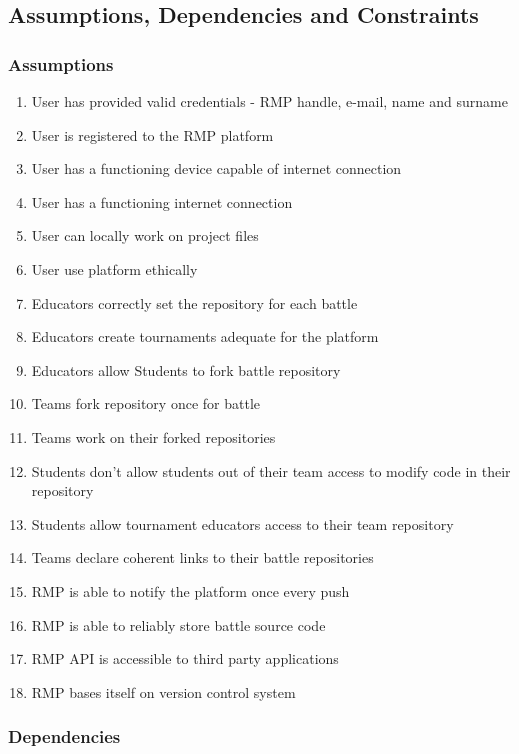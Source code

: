 \subsection{Assumptions, Dependencies and Constraints}

\subsubsection{Assumptions}
\begin{enumerate}[label=$\bullet$ \textbf{D\arabic*:}]
    \item User has provided valid credentials - RMP handle, e-mail, name and surname
    \item User is registered to the RMP platform
    \item User has a functioning device capable of internet connection
    \item User has a functioning internet connection
    \item User can locally work on project files
    \item User use platform ethically
    \item Educators correctly set the repository for each battle
    \item Educators create tournaments adequate for the platform
    \item Educators allow Students to fork battle repository
    \item Teams fork repository once for battle
    \item Teams work on their forked repositories
    \item Students don't allow students out of their team access to modify code in their repository
    \item Students allow tournament educators access to their team repository
    \item Teams declare coherent links to their battle repositories
    \item RMP is able to notify the platform once every push
    \item RMP is able to reliably store battle source code
    \item RMP API is accessible to third party applications
    \item RMP bases itself on version control system
\end{enumerate}

\subsubsection{Dependencies}
